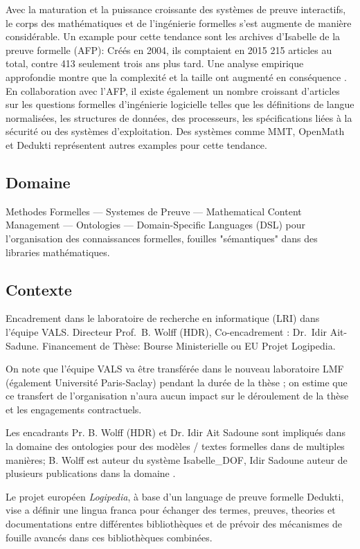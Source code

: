 \documentclass[a4paper,10pt]{article}
\begin{document}
Avec la maturation et la puissance croissante des systèmes de preuve interactifs, le corps des mathématiques et de l'ingénierie formelles s'est augmente  de manière considérable. Un example pour cette tendance sont les  archives d'Isabelle \cite{afp} de la preuve formelle (AFP): Créés en 2004, ils comptaient en 2015 215 articles au total, contre 413 seulement trois ans plus tard. 
Une analyse empirique approfondie montre que la complexité et la taille ont augmenté en conséquence \cite{DBLP:conf/mkm/BlanchetteHMN15}. 
En collaboration avec l'AFP, il existe également un nombre croissant d'articles sur les questions formelles d'ingénierie logicielle telles que les définitions de langue normalisées, les structures de données, des processeurs, les spécifications liées à la sécurité  ou des systèmes d'exploitation. Des systèmes comme MMT\cite{mmt}, OpenMath\cite{openmath} et Dedukti \cite{dedukti} représentent autres examples
pour cette tendance.

\subsection*{Domaine}
Methodes Formelles --- Systemes de Preuve --- Mathematical Content Management --- Ontologies --- Domain-Specific Languages (DSL)
pour l'organisation des connaissances formelles, fouilles "sémantiques" dans des libraries mathématiques.

\subsection*{Contexte}
Encadrement dans le laboratoire de recherche en informatique (LRI)
dans l'équipe VALS\@.
Directeur Prof.\ B. Wolff (HDR), Co-encadrement : Dr.\ Idir Ait-Sadune.
Financement de Thèse: Bourse Ministerielle ou EU Projet Logipedia.

On note que l'équipe VALS va être transférée
dans le nouveau laboratoire LMF (également Université Paris-Saclay)
pendant la durée de la thèse ;
on estime que ce transfert de l'organisation n'aura aucun impact
sur le déroulement de la thèse et les engagements contractuels.

Les encadrants Pr. B. Wolff (HDR) et Dr. Idir Ait Sadoune sont impliqués dans la domaine des ontologies pour des modèles / textes formelles 
dans de multiples manières; B. Wolff est auteur du système Isabelle\_DOF, Idir Sadoune auteur de plusieurs publications dans la domaine 
\cite{DBLP:conf/medi/Ait-SadouneM19}.

Le projet européen \emph{Logipedia}, à base d'un language de preuve formelle Dedukti\cite{dedukti}, vise a définir une lingua franca 
pour échanger des termes, preuves, theories et documentations entre différentes bibliothèques et de prévoir des mécanismes de 
fouille avancés dans ces bibliothèques combinées. 
\end{document}
